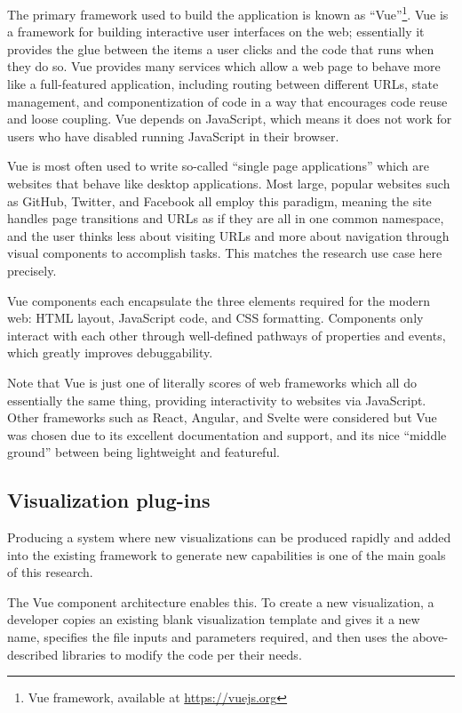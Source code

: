 The primary framework used to build the application is known as ``Vue''\footnote{Vue framework, available at \url{https://vuejs.org}}. Vue is a framework for building interactive user interfaces on the web; essentially it provides the glue between the items a user clicks and the code that runs when they do so. Vue provides many services which allow a web page to behave more like a full-featured application, including routing between different URLs, state management, and componentization of code in a way that encourages code reuse and loose coupling. Vue depends on JavaScript, which means it does not work for users who have disabled running JavaScript in their browser.

Vue is most often used to write so-called ``single page applications'' which are websites that behave like desktop applications. Most large, popular websites such as GitHub, Twitter, and Facebook all employ this paradigm, meaning the site handles page transitions and URLs as if they are all in one common namespace, and the user thinks less about visiting URLs and more about navigation through visual components to accomplish tasks. This matches the research use case here precisely.

Vue components each encapsulate the three elements required for the modern web: HTML layout, JavaScript code, and CSS formatting. Components only interact with each other through well-defined pathways of properties and events, which greatly improves debuggability.

Note that Vue is just one of literally scores of web frameworks which all do essentially the same thing, providing interactivity to websites via JavaScript. Other frameworks such as React, Angular, and Svelte were considered but Vue was chosen due to its excellent documentation and support, and its nice ``middle ground'' between being lightweight and featureful.

\hypertarget{mathub-visualization-plug-ins}{%
\subsection{Visualization plug-ins}\label{visualization-plug-ins}}

Producing a system where new visualizations can be produced rapidly and added into the existing framework to generate new capabilities is one of the main goals of this research.

The Vue component architecture enables this. To create a new visualization, a developer copies an existing blank visualization template and gives it a new name, specifies the file inputs and parameters required, and then uses the above-described libraries to modify the code per their needs.

